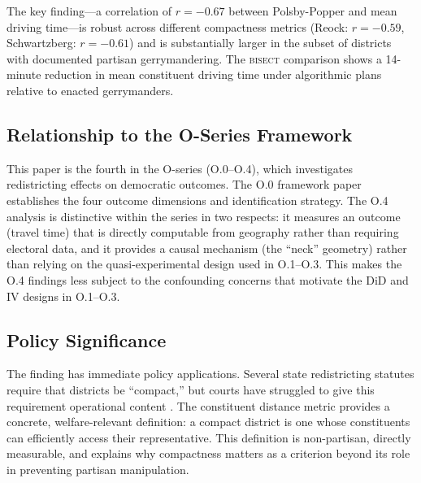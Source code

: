 The key finding---a correlation of $r = -0.67$ between Polsby-Popper and mean driving
time---is robust across different compactness metrics (Reock: $r = -0.59$, Schwartzberg:
$r = -0.61$) and is substantially larger in the subset of districts with documented
partisan gerrymandering. The \textsc{bisect} comparison shows a 14-minute reduction
in mean constituent driving time under algorithmic plans relative to enacted gerrymanders.

\subsection{Relationship to the O-Series Framework}

This paper is the fourth in the O-series (O.0--O.4), which investigates redistricting
effects on democratic outcomes. The O.0 framework paper establishes the four outcome
dimensions and identification strategy. The O.4 analysis is distinctive within the
series in two respects: it measures an outcome (travel time) that is directly computable
from geography rather than requiring electoral data, and it provides a causal mechanism
(the ``neck'' geometry) rather than relying on the quasi-experimental design used in
O.1--O.3. This makes the O.4 findings less subject to the confounding concerns that
motivate the DiD and IV designs in O.1--O.3.

\subsection{Policy Significance}

The finding has immediate policy applications. Several state redistricting statutes
require that districts be ``compact,'' but courts have struggled to give this
requirement operational content \citep{levin2019}. The constituent distance metric
provides a concrete, welfare-relevant definition: a compact district is one whose
constituents can efficiently access their representative. This definition is
non-partisan, directly measurable, and explains why compactness matters as a
criterion beyond its role in preventing partisan manipulation.
